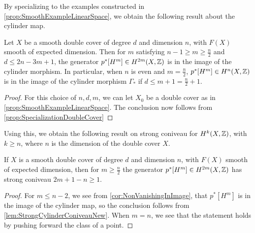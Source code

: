 By specializing to the examples constructed in \cref{prop:SmoothExampleLinearSpace}, we obtain the following result about the cylinder map.
\begin{corollary}
	\label{cor:NonVanishingInImage}
	Let $X$ be a smooth double cover of degree $d$ and dimension $n$, with $F(X)$ smooth of expected dimension. Then for $m$ satisfying $n-1 \geq m \geq \frac{n}{2}$ and $d \leq 2n-3m+1$, the generator $p^*[H^m] \in H^{2m}(X,\mathbb{Z})$ is in the image of the cylinder morphism. In particular, when $n$ is even and $m = \frac{n}{2}$, $p^*[H^m] \in H^n(X,\mathbb{Z})$ is in the image of the cylinder morphism $\Gamma_*$ if $d \leq m+1 = \frac{n}{2}+1$.
\end{corollary}
\begin{proof}
	For this choice of $n,d,m$, we can let $X_0$ be a double cover as in \cref{prop:SmoothExampleLinearSpace}. The conclusion now follows from \cref{prop:SpecializationDoubleCover}
\end{proof}

Using this, we obtain the following result on strong coniveau for $H^k(X,\mathbb{Z})$, with $k \geq n$, where $n$ is the dimension of the double cover $X$.
\begin{corollary}
\label{cor:NonVanishingStrongConiveau}
    If $X$ is a smooth double cover of degree $d$ and dimension $n$, with $F(X)$ smooth of expected dimension, then for $m \geq \frac{n}{2}$ the generator $p^*[H^m] \in H^{2m}(X,\mathbb{Z})$ has strong coniveau $2m+1-n \geq 1$.
\end{corollary}
\begin{proof}
For $m \leq n-2$, we see from \cref{cor:NonVanishingInImage}, that $p^*[H^m]$ is in the image of the cylinder map, so the conclusion follows from \cref{lem:StrongCylinderConiveauNew}. When $m=n$, we see that the statement holds by pushing forward the class of a point. 
\end{proof}

